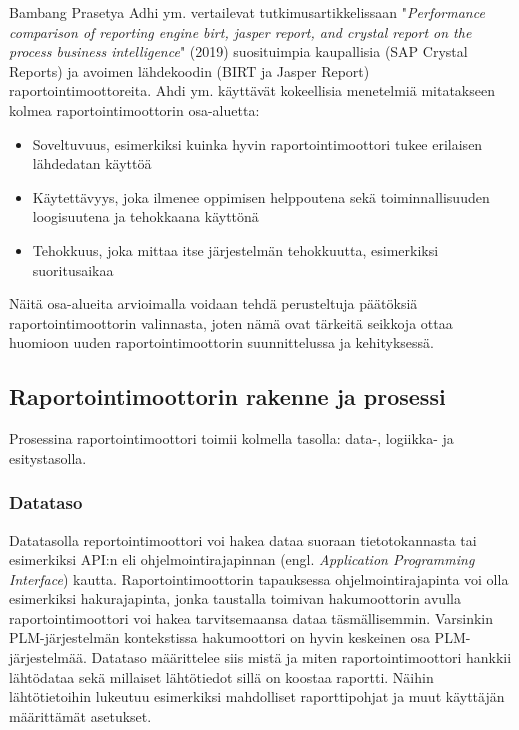 Bambang Prasetya Adhi ym. vertailevat tutkimusartikkelissaan "\textit{Performance comparison of reporting engine birt, jasper report, and crystal report on the process business intelligence}" (2019) \cite{adhi_performance_2019} suosituimpia kaupallisia (SAP Crystal Reports) ja avoimen lähdekoodin (BIRT ja Jasper Report) raportointimoottoreita. Ahdi ym. käyttävät kokeellisia menetelmiä mitatakseen kolmea raportointimoottorin osa-aluetta:
\begin{itemize}
\item Soveltuvuus, esimerkiksi kuinka hyvin raportointimoottori tukee erilaisen lähdedatan käyttöä
\item Käytettävyys, joka ilmenee oppimisen helppoutena sekä toiminnallisuuden loogisuutena ja tehokkaana käyttönä
\item Tehokkuus, joka mittaa itse järjestelmän tehokkuutta, esimerkiksi suoritusaikaa
\end{itemize}
Näitä osa-alueita arvioimalla voidaan tehdä perusteltuja päätöksiä raportointimoottorin valinnasta, joten nämä ovat tärkeitä seikkoja ottaa huomioon uuden raportointimoottorin suunnittelussa ja kehityksessä.

\subsection{Raportointimoottorin rakenne ja prosessi} \label{Raportointimoottorin rakenne ja prosessi}

Prosessina raportointimoottori toimii kolmella tasolla: data-, logiikka- ja esitystasolla.\cite{he_design_2010}

\subsubsection{Datataso}

Datatasolla reportointimoottori voi hakea dataa suoraan tietotokannasta tai esimerkiksi API:n eli ohjelmointirajapinnan (engl. \textit{Application Programming Interface}) kautta. Raportointimoottorin tapauksessa ohjelmointirajapinta voi olla esimerkiksi hakurajapinta, jonka taustalla toimivan hakumoottorin avulla raportointimoottori voi hakea tarvitsemaansa dataa täsmällisemmin. Varsinkin PLM-järjestelmän kontekstissa hakumoottori on hyvin keskeinen osa PLM-järjestelmää. Datataso määrittelee siis mistä ja miten raportointimoottori hankkii lähtödataa sekä millaiset lähtötiedot sillä on koostaa raportti. Näihin lähtötietoihin lukeutuu esimerkiksi mahdolliset raporttipohjat ja muut käyttäjän määrittämät asetukset.


